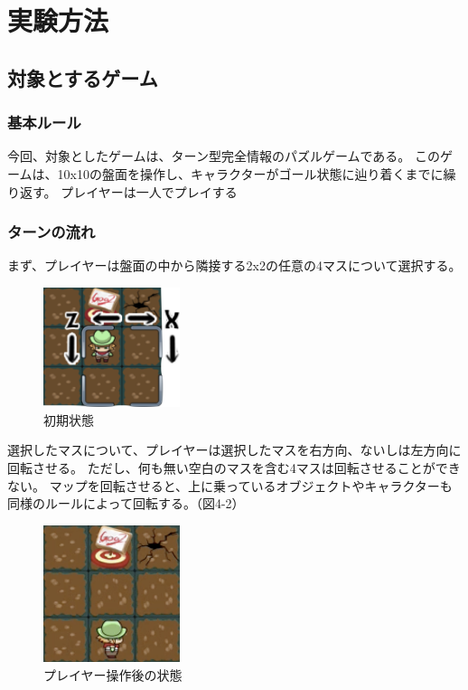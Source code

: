 \chapter{実験方法}
\section{対象とするゲーム} 
\subsection{基本ルール} 
今回、対象としたゲームは、ターン型完全情報のパズルゲームである。
このゲームは、10x10の盤面を操作し、キャラクターがゴール状態に辿り着くまでに繰り返す。
プレイヤーは一人でプレイする
\subsection{ターンの流れ}
まず、プレイヤーは盤面の中から隣接する2x2の任意の4マスについて選択する。

\begin{figure}[htbp]
  \begin{center}
    \includegraphics[bb=0 0 172 150, width=4cm]{images/41.png}
  \end{center}
  \caption{初期状態}
  \label{fig:one}
\end{figure}

選択したマスについて、プレイヤーは選択したマスを右方向、ないしは左方向に回転させる。
ただし、何も無い空白のマスを含む4マスは回転させることができない。
マップを回転させると、上に乗っているオブジェクトやキャラクターも同様のルールによって回転する。（図4-2）

\begin{figure}[htbp]
  \begin{center}
    \includegraphics[bb=0 0 172 150, width=4cm]{images/42.png}
  \end{center}
  \caption{プレイヤー操作後の状態}
  \label{fig:one}
\end{figure}


